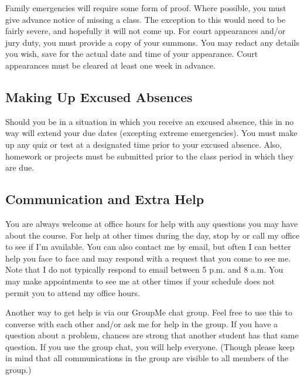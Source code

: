 \documentclass[11pt]{article}
\begin{document}
Family emergencies will require some form of proof. Where possible,
you must give advance notice of missing a class. The exception to this
would need to be fairly severe, and hopefully it will not come up.
For court appearances and/or jury duty, you must provide a copy of
your summons. You may redact any details you wish, save for the
actual date and time of your appearance. Court appearances must be
cleared at least one week in advance.

\subsection*{Making Up Excused Absences}
Should you be in a situation in which you receive an excused absence,
this in no way will extend your due dates (excepting extreme
emergencies). You must make up any quiz or test at a designated time 
prior to your excused absence. Also, homework or projects must
be submitted prior to the class period in which they are due.

\subsection*{Communication and Extra Help}
You are always welcome at office hours for help with any
questions you may have about the course. For help at other times during the day, stop by or call my office to see if I'm available. You can also contact me by email, but often I can better help you face to face and may respond with a request that
you come to see me. Note that I do not typically respond to email between 5 p.m. and 8 a.m. You may make appointments to see me at other times if your schedule does not permit you to attend my office hours.

Another way to get help is via our GroupMe chat group.  Feel free to use this to converse with each other and/or ask me for help in the group.  If you have a question about a problem, chances are strong that another student has that same question.  If you use the group chat, you will help everyone. (Though please keep in mind that all communications in the group are visible to all members of the group.) 
\end{document}
